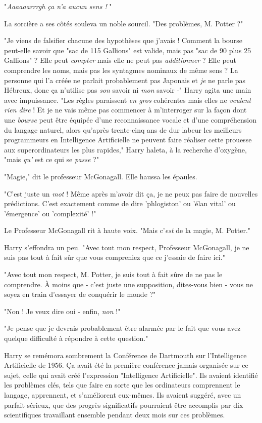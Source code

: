 "\emph{Aaaaaarrrgh ça n'a aucun sens !} "

La sorcière a ses côtés souleva un noble sourcil. "Des problèmes, M. Potter ?"

"Je viens de falsifier chacune des hypothèses que j'avais ! Comment la bourse peut-elle savoir que "sac de 115 Gallions" est valide, mais pas "sac de 90 plus 25 Gallions" ? Elle peut \emph{compter}  mais elle ne peut pas \emph{additionner}  ? Elle peut comprendre les noms, mais pas les syntagmes nominaux de même sens ? La personne qui l'a créée ne parlait probablement pas Japonais et \emph{je}  ne parle pas Hébreux, donc ça n'utilise pas \emph{son}  savoir ni \emph{mon } savoir -" Harry agita une main avec impuissance. "Les règles paraissent \emph{en gros}  cohérentes mais elles ne \emph{veulent rien dire}  ! Et je ne vais même pas commencer à m'interroger sur la façon dont une \emph{bourse}  peut être équipée d'une reconnaissance vocale et d'une compréhension du langage naturel, alors qu'après trente-cinq ans de dur labeur les meilleurs programmeurs en Intelligence Artificielle ne peuvent faire réaliser cette prouesse aux superordinateurs les plus rapides," Harry haleta, à la recherche d'oxygène, "mais \emph{qu'} est ce qui se \emph{passe}  ?"

"Magie," dit le professeur McGonagall. Elle haussa les épaules.

"C'est juste un \emph{mot}  ! Même après m'avoir dit ça, je ne peux pas faire de nouvelles prédictions. C'est exactement comme de dire 'phlogiston' ou 'élan vital' ou 'émergence' ou 'complexité' !"

Le Professeur McGonagall rit à haute voix. "Mais c'\emph{est}  de la magie, M. Potter."

Harry s'effondra un peu. "Avec tout mon respect, Professeur McGonagall, je ne suis pas tout à fait sûr que vous compreniez que ce j'essaie de faire ici."

"Avec tout mon respect, M. Potter, je suis tout à fait sûre de ne pas le comprendre. À moins que - c'est juste une supposition, dites-vous bien - vous ne soyez en train d'essayer de conquérir le monde ?"

"Non ! Je veux dire oui - enfin, \emph{non}  !"

"Je pense que je devrais probablement être alarmée par le fait que vous avez quelque difficulté à répondre à cette question."

Harry se remémora sombrement la Conférence de Dartmouth sur l'Intelligence Artificielle de 1956. Ça avait été la première conférence jamais organisée sur ce sujet, celle qui avait créé l'expression "Intelligence Artificielle". Ils avaient identifié les problèmes clés, tels que faire en sorte que les ordinateurs comprennent le langage, apprennent, et s'améliorent eux-mêmes. Ils avaient suggéré, avec un parfait sérieux, que des progrès significatifs pourraient être accomplis par dix scientifiques travaillant ensemble pendant deux mois sur ces problèmes.


